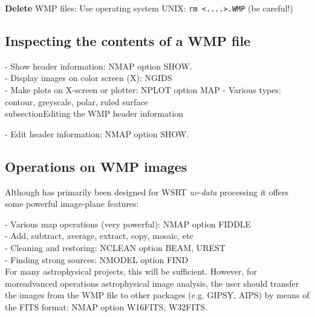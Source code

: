 {\bf Delete} WMP files: 
Use operating system UNIX: {\tt rm <....>.WMP} (be careful!) 



\subsection{Inspecting the contents of a WMP file} 
\label{wmp.inspect} 

- Show header information: NMAP option SHOW.\\ 
- Display images on color screen (X): NGIDS\\ 
- Make plots on X-screen or plotter: NPLOT option MAP 
\hspace*{5mm} - Various types: contour, greyscale, polar, ruled surface\\ 


subsection{Editing the WMP header information} 
\label{wmp.edit} 

- Edit header information: NMAP option SHOW.\\ 


\subsection{Operations on WMP images} 
\label{wmp.oper} 

	Although \NEWSTAR has primarily been designed for WSRT {\em uv-data}
processing it offers some powerful image-plane features: 

- Various map operations (very powerful): NMAP option FIDDLE\\ 
\hspace*{5mm} - Add, subtract, average, extract, copy, mosaic, etc\\ 
- Cleaning and restoring: NCLEAN option BEAM, UREST\\ 
- Finding strong sources: NMODEL option FIND\\ 

	For many astrophysical projects, this will be sufficient. 
However, for moreadvanced operations astrophysical image analysis, the user
should transfer the images from the WMP file to other packages 
(e.g.  GIPSY, AIPS) by means of the FITS format: NMAP option W16FITS, 
W32FITS.


